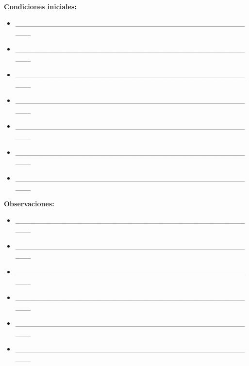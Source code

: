 \vspace{0.5em}
\textbf{Condiciones iniciales:}
\begin{itemize}
  \item \_\_\_\_\_\_\_\_\_\_\_\_\_\_\_\_\_\_\_\_\_\_\_\_\_\_\_\_\_\_\_\_\_\_\_\_\_\_\_\_\_\_\_\_\_\_\_\_
  \item \_\_\_\_\_\_\_\_\_\_\_\_\_\_\_\_\_\_\_\_\_\_\_\_\_\_\_\_\_\_\_\_\_\_\_\_\_\_\_\_\_\_\_\_\_\_\_\_
  \item \_\_\_\_\_\_\_\_\_\_\_\_\_\_\_\_\_\_\_\_\_\_\_\_\_\_\_\_\_\_\_\_\_\_\_\_\_\_\_\_\_\_\_\_\_\_\_\_
  \item \_\_\_\_\_\_\_\_\_\_\_\_\_\_\_\_\_\_\_\_\_\_\_\_\_\_\_\_\_\_\_\_\_\_\_\_\_\_\_\_\_\_\_\_\_\_\_\_
  \item \_\_\_\_\_\_\_\_\_\_\_\_\_\_\_\_\_\_\_\_\_\_\_\_\_\_\_\_\_\_\_\_\_\_\_\_\_\_\_\_\_\_\_\_\_\_\_\_
  \item \_\_\_\_\_\_\_\_\_\_\_\_\_\_\_\_\_\_\_\_\_\_\_\_\_\_\_\_\_\_\_\_\_\_\_\_\_\_\_\_\_\_\_\_\_\_\_\_
  \item \_\_\_\_\_\_\_\_\_\_\_\_\_\_\_\_\_\_\_\_\_\_\_\_\_\_\_\_\_\_\_\_\_\_\_\_\_\_\_\_\_\_\_\_\_\_\_\_
\end{itemize}

\vspace{0.5em}
\textbf{Observaciones:}
\begin{itemize}
  \item \_\_\_\_\_\_\_\_\_\_\_\_\_\_\_\_\_\_\_\_\_\_\_\_\_\_\_\_\_\_\_\_\_\_\_\_\_\_\_\_\_\_\_\_\_\_\_\_
  \item \_\_\_\_\_\_\_\_\_\_\_\_\_\_\_\_\_\_\_\_\_\_\_\_\_\_\_\_\_\_\_\_\_\_\_\_\_\_\_\_\_\_\_\_\_\_\_\_
  \item \_\_\_\_\_\_\_\_\_\_\_\_\_\_\_\_\_\_\_\_\_\_\_\_\_\_\_\_\_\_\_\_\_\_\_\_\_\_\_\_\_\_\_\_\_\_\_\_
  \item \_\_\_\_\_\_\_\_\_\_\_\_\_\_\_\_\_\_\_\_\_\_\_\_\_\_\_\_\_\_\_\_\_\_\_\_\_\_\_\_\_\_\_\_\_\_\_\_
  \item \_\_\_\_\_\_\_\_\_\_\_\_\_\_\_\_\_\_\_\_\_\_\_\_\_\_\_\_\_\_\_\_\_\_\_\_\_\_\_\_\_\_\_\_\_\_\_\_
  \item \_\_\_\_\_\_\_\_\_\_\_\_\_\_\_\_\_\_\_\_\_\_\_\_\_\_\_\_\_\_\_\_\_\_\_\_\_\_\_\_\_\_\_\_\_\_\_\_
\end{itemize}

